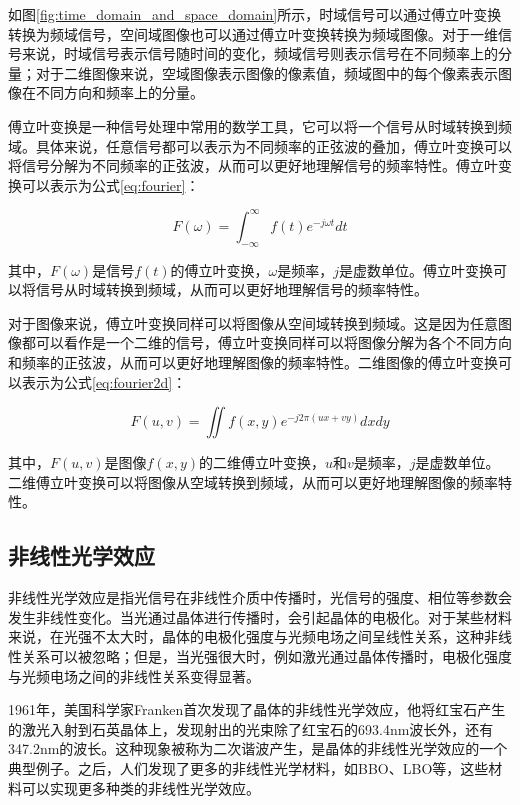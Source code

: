 如图\ref{fig:time_domain_and_space_domain}所示，时域信号可以通过傅立叶变换转换为频域信号，空间域图像也可以通过傅立叶变换转换为频域图像。对于一维信号来说，时域信号表示信号随时间的变化，频域信号则表示信号在不同频率上的分量；对于二维图像来说，空域图像表示图像的像素值，频域图中的每个像素表示图像在不同方向和频率上的分量。

傅立叶变换是一种信号处理中常用的数学工具，它可以将一个信号从时域转换到频域。具体来说，任意信号都可以表示为不同频率的正弦波的叠加，傅立叶变换可以将信号分解为不同频率的正弦波，从而可以更好地理解信号的频率特性。傅立叶变换可以表示为公式\ref{eq:fourier}：

\begin{equation}
    F(\omega) = \int_{-\infty}^{\infty} f(t) e^{-j\omega t} dt
    \label{eq:fourier}
\end{equation}

其中，$F(\omega)$是信号$f(t)$的傅立叶变换，$\omega$是频率，$j$是虚数单位。傅立叶变换可以将信号从时域转换到频域，从而可以更好地理解信号的频率特性。

对于图像来说，傅立叶变换同样可以将图像从空间域转换到频域。这是因为任意图像都可以看作是一个二维的信号，傅立叶变换同样可以将图像分解为各个不同方向和频率的正弦波，从而可以更好地理解图像的频率特性。二维图像的傅立叶变换可以表示为公式\ref{eq:fourier2d}：

\begin{equation}
    F(u, v) = \iint f(x, y) e^{-j2\pi(ux+vy)} dx dy
    \label{eq:fourier2d}
\end{equation}

其中，$F(u, v)$是图像$f(x, y)$的二维傅立叶变换，$u$和$v$是频率，$j$是虚数单位。二维傅立叶变换可以将图像从空域转换到频域，从而可以更好地理解图像的频率特性。

\subsection{非线性光学效应}

非线性光学效应是指光信号在非线性介质中传播时，光信号的强度、相位等参数会发生非线性变化。当光通过晶体进行传播时，会引起晶体的电极化。对于某些材料来说，在光强不太大时，晶体的电极化强度与光频电场之间呈线性关系，这种非线性关系可以被忽略；但是，当光强很大时，例如激光通过晶体传播时，电极化强度与光频电场之间的非线性关系变得显著。

1961年，美国科学家Franken首次发现了晶体的非线性光学效应，他将红宝石产生的激光入射到石英晶体上，发现射出的光束除了红宝石的693.4nm波长外，还有347.2nm的波长。这种现象被称为二次谐波产生，是晶体的非线性光学效应的一个典型例子。之后，人们发现了更多的非线性光学材料，如BBO、LBO等，这些材料可以实现更多种类的非线性光学效应。

